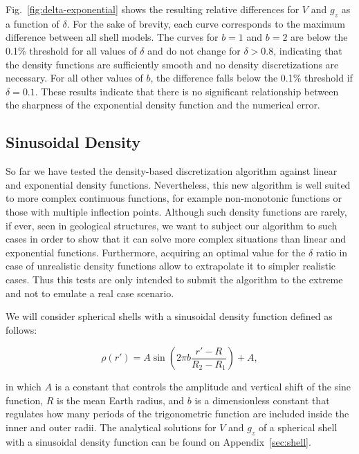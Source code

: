 \documentclass[extra, referee]{gji}
\begin{document}
Fig.~\ref{fig:delta-exponential} shows the resulting relative
differences for $V$ and $g_z$ as a function of $\delta$.
For the sake of brevity, each curve corresponds to the maximum difference between all
shell models.
The curves for $b=1$ and $b=2$ are below the 0.1\% threshold for all values of $\delta$
and do not change for $\delta > 0.8$, indicating that the density
functions are sufficiently smooth and no density discretizations are necessary.
For all other values of $b$, the difference falls below the 0.1\% threshold
if $\delta = 0.1$.
These results indicate that there is no significant relationship between the
sharpness of the exponential density function and the numerical error.


\subsection{Sinusoidal Density}

So far we have tested the density-based discretization algorithm against linear and
exponential density functions.
Nevertheless, this new algorithm is well suited to more complex continuous functions,
for example non-monotonic functions or those with multiple inflection points.
Although such density functions are rarely, if ever, seen in geological structures,
we want to subject our algorithm to such cases in order to show that it can solve more
complex situations than linear and exponential functions.
Furthermore, acquiring an optimal value for the $\delta$ ratio in case of unrealistic
density functions allow to extrapolate it to simpler realistic cases.
Thus this tests are only intended to submit the algorithm to the extreme and not to
emulate a real case scenario.

We will consider spherical shells with a sinusoidal density function defined as follows:

\begin{equation}
    \rho(r') = A \sin \left( 2 \pi b \frac{r' - R}{R_2 - R_1} \right) + A,
    \label{eq:density-sine}
\end{equation}

\noindent in which $A$ is a constant that controls the amplitude and vertical shift of
the sine function, $R$ is the mean Earth radius, and $b$ is a dimensionless constant
that regulates how many periods of the trigonometric function are included inside the
inner and outer radii.
The analytical solutions for $V$ and $g_z$ of a spherical shell with a sinusoidal
density function can be found on Appendix~\ref{sec:shell}.
\end{document}
